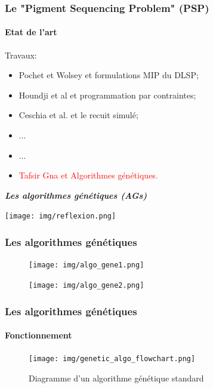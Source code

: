\documentclass[11pt]{beamer}
\begin{document}
 \begin{frame}
 \transreplace
 \frametitle{Le "Pigment Sequencing Problem" (PSP)}
 \framesubtitle{Etat de l'art} 
 
 	Travaux:
    \begin{itemize}
    	\item Pochet et Wolsey et formulations MIP du DLSP;
    	\item<2->Houndji et al et programmation par contraintes;
    	\item<3->Ceschia et al. et le recuit simulé;
    	\item<4-> ...
    	\item<5-> ...
    	\item<6-> \LARGE{\textcolor{red}{Tafsir Gna et Algorithmes génétiques.}}
    \end{itemize}
 \end{frame} 
 
 \begin{frame}
 	\begin{minipage}[c]{.46\linewidth}
      \Large{\emph{\textbf{Les algorithmes génétiques (AGs)}}}
   \end{minipage} \hfill
   \begin{minipage}[c]{.46\linewidth}
		\texttt{[image: img/reflexion.png]}
   \end{minipage}
\end{frame}  


\begin{frame}
\frametitle{Les algorithmes génétiques}
\begin{figure}
   \begin{minipage}[c]{.46\linewidth}
      \texttt{[image: img/algo\_gene1.png]}
   \end{minipage} \hfill
   \begin{minipage}[c]{.46\linewidth}
      \texttt{[image: img/algo\_gene2.png]}
   \end{minipage}
 \end{figure}
\end{frame} 

\begin{frame}
\frametitle{Les algorithmes génétiques}
\framesubtitle{Fonctionnement}
\begin{figure}
      \texttt{[image: img/genetic\_algo\_flowchart.png]}
      \caption{Diagramme d'un algorithme génétique standard}
	  \label{fig:genetic_algo_flowchart}
 \end{figure}
\end{frame} 
\end{document}
